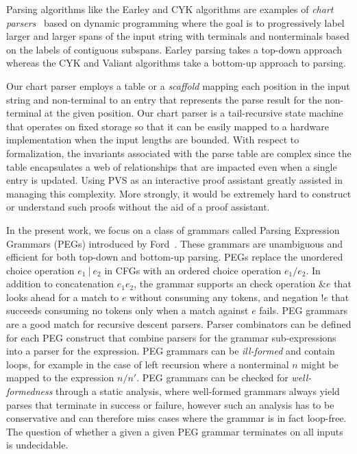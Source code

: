 \documentclass[sigplan,10pt,anonymous,review]{acmart}\settopmatter{printfolios=true,printccs=false,printacmref=false}
\begin{document}
Parsing algorithms like the Earley and CYK algorithms are examples of \emph{chart
parsers}~\cite{earley1970efficient,kay1986algorithm,pereira1983parsing} based on dynamic programming where the goal is to
progressively label larger and larger spans of the input string with
terminals and nonterminals based on the labels of contiguous subspans.
Earley parsing takes a top-down approach whereas the CYK and Valiant
algorithms take a bottom-up approach to parsing.

Our chart parser employs a table or a \emph{scaffold} mapping each
position in the input string and non-terminal to an entry that
represents the parse result for the non-terminal at the given
position. Our chart parser is a tail-recursive state machine that
operates on fixed storage so that it can be easily mapped to a
hardware implementation when the input lengths are bounded.
With respect to formalization, the invariants
associated with the parse table are complex since the table
encapsulates a web of relationships that are impacted 
even when a single entry is updated. Using PVS as an interactive proof assistant
greatly assisted in managing this complexity.  More strongly, it 
would be extremely hard to construct or understand such proofs
without the aid of a proof assistant. 


In the present work, we focus on a class of grammars called Parsing
Expression Grammars (PEGs) introduced by Ford~\cite{DBLP:conf/popl/Ford04}.  These grammars are
unambiguous and efficient for both top-down and bottom-up parsing.
PEGs replace the unordered choice operation $e_1 ~|~ e_2$ in CFGs with
an ordered choice operation $e_1/e_2$\@.  In addition to concatenation
$e_1 e_2$, the grammar supports an check operation $\& e$ that looks
ahead for a match to $e$ without consuming any tokens, and negation
$!e$ that succeeds consuming no tokens only when a match against $e$
fails.   PEG grammars are a good match for  recursive descent
parsers.  Parser combinators can be defined for each PEG construct that
combine parsers for the grammar sub-expressions into a parser for the
expression.  PEG grammars can be \emph{ill-formed} and contain loops, for
example in the case of left recursion where a
nonterminal $n$ might be mapped to the expression $n/n'$\@.  PEG grammars can
be checked for \emph{well-formedness} through a static analysis, where
well-formed grammars always yield parses that terminate in success or
failure, however such an analysis has to be conservative and can therefore miss cases where the grammar
is in fact loop-free.  The question of whether a given a given PEG grammar terminates
on all inputs is undecidable.  
\end{document}

